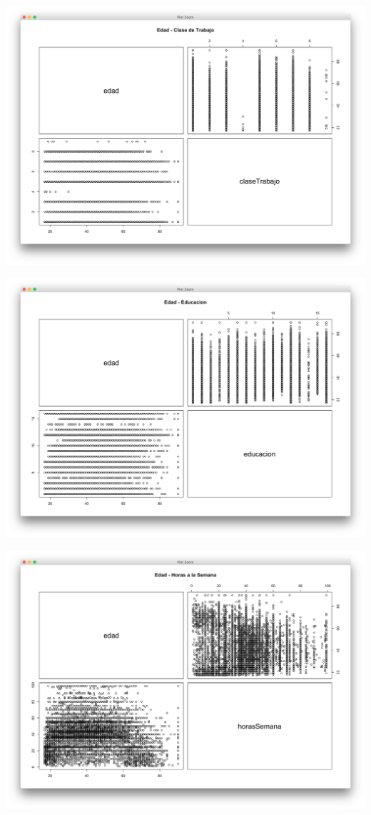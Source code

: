 \documentclass{article}
\begin{document}
  \begin{center}
    \hbox{\hspace{-5.5em}\includegraphics[scale=0.45]{graficas/edadClaseTrab}}
  \end{center}
  \begin{center}
    \hbox{\hspace{-5.5em}\includegraphics[scale=0.45]{graficas/edadEdu}}
  \end{center}
  \begin{center}
    \hbox{\hspace{-5.5em}\includegraphics[scale=0.45]{graficas/edadHoras}}
  \end{center}
\end{document}
